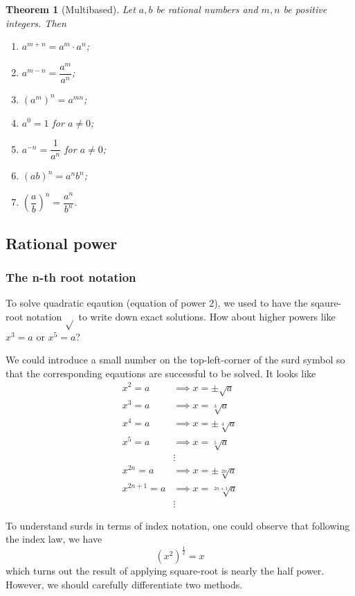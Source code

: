 \documentclass[12pt]{article}
\newtheorem*{theorem}{Theorem}
\begin{document}
    \begin{theorem}[Multibased]
        Let $a, b$ be rational numbers and $m, n$ be positive integers. Then\begin{enumerate}
            \item $a^{m+n}=a^m\cdot a^n$;
            \item $a^{m-n}=\dfrac{a^m}{a^n}$;
            \item $(a^m)^n=a^{mn}$;
            \item $a^0=1$ for $a\neq 0$;
            \item $a^{-n}=\dfrac{1}{a^n}$ for $a\neq 0$;
            \item $(ab)^n=a^n b^n$;
            \item $(\dfrac{a}{b})^n=\dfrac{a^n}{b^n}$.
        \end{enumerate}
    \end{theorem}

    \subsection{Rational power}

    \subsubsection*{The n-th root notation}

    To solve quadratic eqaution (equation of power 2), we used to have the sqaure-root notation $\sqrt{}$ to write down exact solutions. How about higher powers like $x^3=a$ or $x^5=a$?

    We could introduce a small number on the top-left-corner of the surd symbol so that the corresponding eqautions are successful to be solved. It looks like \begin{align*}
        x^2=a &\implies x=\pm\sqrt{a}\\
        x^3=a &\implies x=\sqrt[3]{a}\\
        x^4=a &\implies x=\pm\sqrt[4]{a}\\
        x^5=a &\implies x=\sqrt[5]{a}\\ 
        &\vdots\\
        x^{2n}=a &\implies x=\pm\sqrt[2n]{a}\\
        x^{2n+1}=a &\implies x=\sqrt[2n+1]{a}\\
        &\vdots 
    \end{align*}

    To understand surds in terms of index notation, one could observe that following the index law, we have $$(x^2)^{\frac{1}{2}}=x$$ which turns out the result of applying square-root is nearly the half power. However, we should carefully differentiate two methods.
\end{document}
